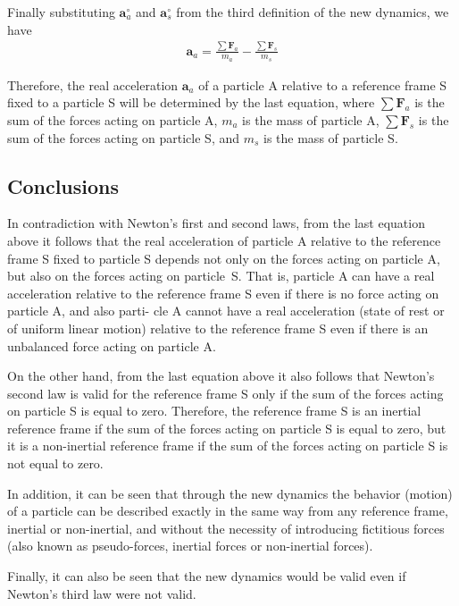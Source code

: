 \documentclass[11pt]{article}
\newcommand{\vA}{\mathbf{a}}
\newcommand{\vF}{\mathbf{F}}
\newcommand{\mM}{m}
\newcommand{\ra}{_a}
\newcommand{\rs}{_s}
\begin{document}
\newpage \baselineskip=14.40pt

\par Finally substituting $\vA^{\circ}\ra$ and $\vA^{\circ}\rs$ from the third definition of the new dynamics, we have
\begin{eqnarray*}
\vA\ra = \frac{\sum \vF\ra}{\mM\ra} - \frac{\sum \vF\rs}{\mM\rs}
\end{eqnarray*}
\par Therefore, the real acceleration $\vA\ra$ of a particle A relative to a reference frame S fixed to a particle S will be determined by the last equation, where $\sum \vF\ra$ is the sum of the forces acting on particle A, $\mM\ra$ is the mass of particle A, $\sum \vF\rs$ is the sum of the forces acting on particle S, and $\mM\rs$ is the mass of particle S.

\vspace{-0.9em}

{\centering\subsection*{Conclusions}}

\par In contradiction with Newton's first and second laws, from the last equation above it follows that the real acceleration of particle A relative to the reference frame S fixed to particle S depends not only on the forces acting on particle A, but also on the forces acting on \hbox {particle S}. That is, particle A can have a real acceleration relative to the reference frame S even if there is no force acting on particle A, and also parti- cle A cannot have a real acceleration (state of rest or of uniform linear motion) relative to the reference frame S even if there is an unbalanced force acting on particle A.
\medskip
\par On the other hand, from the last equation above it also follows that Newton's second law is valid for the reference frame S only if the sum of the forces acting on particle S is equal to zero. Therefore, the reference frame S is an inertial reference frame if the sum of the forces acting on particle S is equal to zero, but it is a non-inertial reference frame if the sum of the forces acting on particle S is not equal to zero.
\medskip
\par In addition, it can be seen that through the new dynamics the behavior (motion) of a particle can be described exactly in the same way from any reference frame, inertial or non-inertial, and without the necessity of introducing fictitious forces (also known as pseudo-forces, \hbox {inertial} forces or non-inertial forces).
\medskip
\par Finally, it can also be seen that the new dynamics would be valid even if Newton's third law were not valid.
\end{document}
